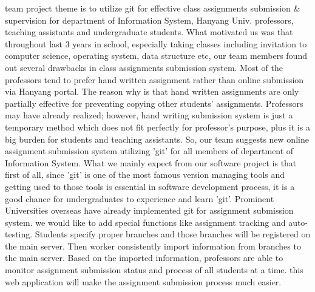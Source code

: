 \documentclass[10pt,journal,compsoc]{IEEEtran}
\begin{document}
% 
% 
% 
% 
 team project theme is to utilize git for effective class assignments submission & supervision for department of Information System, Hanyang Univ. professors, teaching assistants and undergraduate students. What motivated us was that throughout last 3 years in school, especially taking classes including invitation to computer science, operating system, data structure etc, our team members found out several drawbacks in class assignments submission system. Most of the professors tend to prefer hand written assignment rather than online submission via Hanyang portal. The reason why is that hand written assignments are only partially effective for preventing copying other students' assignments. Professors may have already realized; however, hand writing submission system is just a temporary method which does not fit perfectly for professor's purpose, plus it is a big burden for students and teaching assistants. So, our team suggests new online assignment submission system utilizing 'git' for all members of department of Information System. What we mainly expect from our software project is that first of all, since 'git' is one of the most famous version managing tools and getting used to those tools is essential in software development process, it is a good chance for undergraduates to experience and learn 'git'. Prominent Universities overseas have already implemented git for assignment submission system. we would like to add special functions like assignment tracking and auto-testing. Students specify proper branches and those branches will be registered on the main server. Then worker consistently import information from branches to the main server. Based on the imported information, professors are able to monitor assignment submission status and process of all students at a time. this web application will make the assignment submission process much easier.
\end{document}
